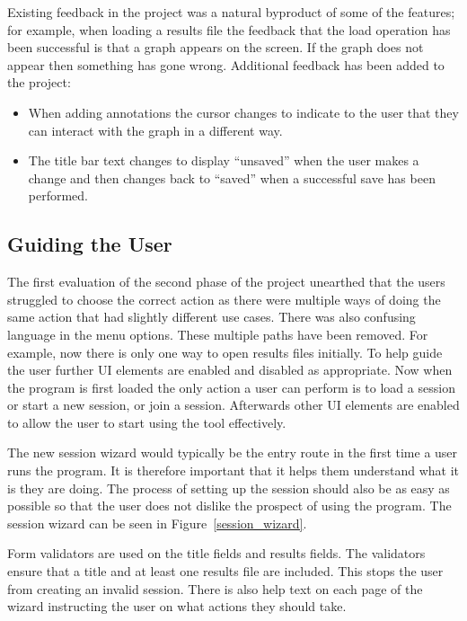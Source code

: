 Existing feedback in the project was a natural byproduct of some of the features; for example, when loading a results file the feedback that the load operation has been successful is that a graph appears on the screen. If the graph does not appear then something has gone wrong.  Additional feedback has been added to the project:
\begin{itemize}
\item When adding annotations the cursor changes to indicate to the user that they can interact with the graph in a different way.
\item The title bar text changes to display ``unsaved'' when the user makes a change and then changes back to ``saved'' when a successful save has been performed.
\end{itemize}

\subsection{Guiding the User}

The first evaluation of the second phase of the project unearthed that the users struggled to choose the correct action as there were multiple ways of doing the same action that had slightly different use cases.  There was also confusing language in the menu options.  These multiple paths have been removed. For example, now there is only one way to open results files initially.  To help guide the user further \ac{UI} elements are enabled and disabled as appropriate.  Now when the program is first loaded the only action a user can perform is to load a session or start a new session, or join a session.  Afterwards other \ac{UI} elements are enabled to allow the user to start using the tool effectively.

The new session wizard would typically be the entry route in the first time a user runs the program.  It is therefore important that it helps them understand what it is they are doing.  The process of setting up the session should also be as easy as possible so that the user does not dislike the prospect of using the program.  The session wizard can be seen in Figure~\ref{session_wizard}.

Form validators are used on the title fields and results fields.  The validators ensure that a title and at least one results file are included.  This stops the user from creating an invalid session.  There is also help text on each page of the wizard instructing the user on what actions they should take.

